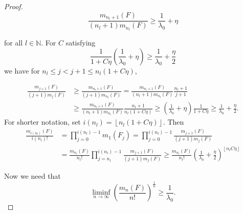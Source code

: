 \documentclass[12pt,a4paper]{scrartcl}
\numberwithin{equation}{section}
\newcommand{\N}{\mathbb{N}} %
\begin{document}
\begin{proof}
\begin{equation}\label{eq:forlateruse}
\frac{m_{n_l+1}\left(F\right)}{\left(n_l+1\right) m_{n_l}\left(F\right)} \geq \frac{1}{\lambda_0} + \eta
\end{equation}

for all $ l \in \N $. For $C$ satisfying
$$ \frac{1}{1+C\eta}\left(\frac{1}{\lambda_0}+\eta\right) \geq \frac{1}{\lambda_0} + \frac{\eta}{2} $$
we have for $n_l \leq j < j+1 \leq n_l\left(1+C\eta\right)$,

\begin{align*}
\frac{m_{j+1}\left(F\right)}{\left(j+1\right) m_j\left(F\right)} &\geq \frac{m_{n_l+1}\left(F\right)}{\left(j+1\right) m_{n_l}\left(F\right)} = \frac{m_{n_l+1}\left(F\right)}{\left(n_l+1\right) m_{n_l}\left(F\right)} \frac{n_l+1}{j+1} \\
&\geq \frac{m_{n_l+1}\left(F\right)}{\left(n_l+1\right) m_{n_l}\left(F\right)} \frac{n_l+1}{n_l\left(1+C\eta\right)} \geq \left(\frac{1}{\lambda_0}+\eta\right) \frac{1}{1+C\eta} \geq \frac{1}{\lambda_0} + \frac{\eta}{2}.
\end{align*} 
For shorter notation, set $i\left(n_l\right) = \left\lfloor n_l\left(1+C\eta\right)\right\rfloor$. Then
\begin{align*}
\frac{m_{i\left(n_l\right)}\left(F\right)}{i\left(n_l\right)!} &= \prod_{j=0}^{i\left(n_l\right)-1} m_1\left(F_j\right) = \prod_{j=0}^{i\left(n_l\right)-1} \frac{m_{j+1}\left(F\right)}{\left(j+1\right) m_j\left(F\right)} \\
&= \frac{m_{n_l}\left(F\right)}{n_l!} \prod_{j=n_l}^{i\left(n_l\right)-1} \frac{m_{j+1}\left(F\right)}{\left(j+1\right) m_j\left(F\right)} \geq \frac{m_{n_l}\left(F\right)}{n_l!} \left(\frac{1}{\lambda_0} + \frac{\eta}{2}\right)^{\left\lfloor n_lC\eta \right\rfloor}
\end{align*}

Now we need that
\begin{equation}
\liminf_{n \to \infty} \left(\frac{m_n\left(F\right)}{n!}\right)^{\frac{1}{n}} \geq \frac{1}{\lambda_0}.
\end{equation} 


\end{proof}
\end{document}

